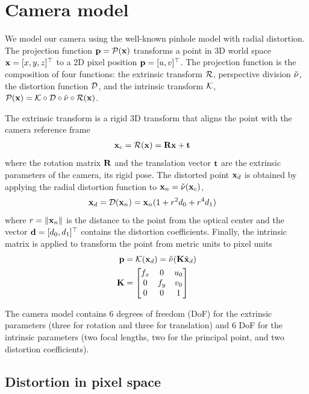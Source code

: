 \documentclass[10pt,twocolumn,letterpaper]{article}
\begin{document}
\section{Camera model}
\label{sec:camera}

We model our camera using the well-known pinhole model with radial distortion. The projection function $\mathbf{p}=\mathcal{P}(\mathbf{x})$ transforms a point in 3D world space $\mathbf{x}=[x,y,z]^\top$ to a 2D pixel position $\mathbf{p}=[u,v]^\top$. The projection function is the composition of four functions: the extrinsic transform $\mathcal{R}$, perspective division $\check{\nu}$, the distortion function $\mathcal{D}$, and the intrinsic transform $\mathcal{K}$, \ie $\mathcal{P}(\mathbf{x}) = \mathcal{K} \circ \mathcal{D} \circ \check{\nu} \circ \mathcal{R}(\mathbf{x})$.

The extrinsic transform is a rigid 3D transform that aligns the point with the camera reference frame
%
\begin{align}
\mathbf{x}_c &= \mathcal{R}(\mathbf{x}) = \mathbf{R} \mathbf{x} + \mathbf{t} 
\end{align}
%
where the rotation matrix $\mathbf{R}$ and the translation vector $\mathbf{t}$ are the extrinsic parameters of the camera, \ie its rigid pose. The distorted point $\mathbf{x}_d$ is obtained by applying the radial distortion function to $\mathbf{x}_n = \check{\nu}(\mathbf{x}_c)$, \ie
%
\begin{align}
\mathbf{x}_d = \mathcal{D}(\mathbf{x}_n) &= \mathbf{x}_n (1+r^2 d_0 + r^4 d_1)
\label{eq:distortion}
\end{align}
%
where $r = \lVert\mathbf{x}_n\rVert$ is the distance to the point from the optical center and the vector $\mathbf{d}=[d_0,d_1]^\top$ contains the distortion coefficients. Finally, the intrinsic matrix is applied to transform the point from metric units to pixel units
%
\begin{align}
\mathbf{p} &= \mathcal{K}(\mathbf{x}_d) = \check{\nu}(\mathbf{K} \hat{\mathbf{x}}_d)
\\
\mathbf{K} &= \begin{bmatrix}
f_x & 0 & u_0 \\
0 & f_y & v_0 \\
0 & 0 & 1
\end{bmatrix}
\label{eq:intrinsic_matrix}
\end{align}
%

The camera model contains 6 degrees of freedom (DoF) for the extrinsic parameters (three for rotation and three for translation) and 6 DoF for the intrinsic parameters (two focal lengths, two for the principal point, and two distortion coefficients). 

\subsection{Distortion in pixel space}
\end{document}
